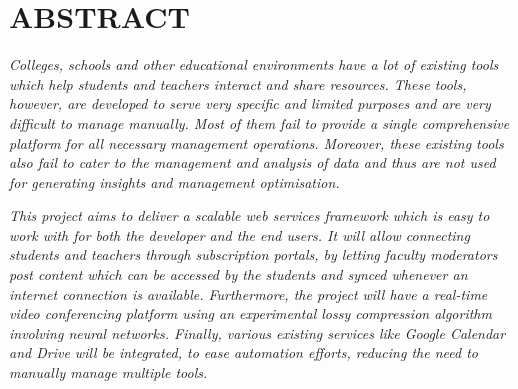 \chapter*{ABSTRACT}

\emph{Colleges, schools and other educational environments have a lot of existing tools which help students and teachers interact and share resources. 
These tools, however, are developed to serve very specific and limited purposes and are very difficult to manage manually. 
Most of them fail to provide a single comprehensive platform for all necessary management operations. 
Moreover, these existing tools also fail to cater to the management and analysis of data and thus are not used for generating insights and management optimisation.}

\emph{This project aims to deliver a scalable web services framework which is easy to work with for both the developer and the end users. 
It will allow connecting students and teachers through subscription portals, by letting faculty moderators post content which can be accessed by the students and synced whenever an internet connection is available. 
Furthermore, the project will have a real-time video conferencing platform 
using an experimental lossy compression algorithm involving neural networks. 
Finally, various existing services like Google Calendar and Drive will be integrated, to ease 
automation efforts, reducing the need to manually manage multiple tools.}

